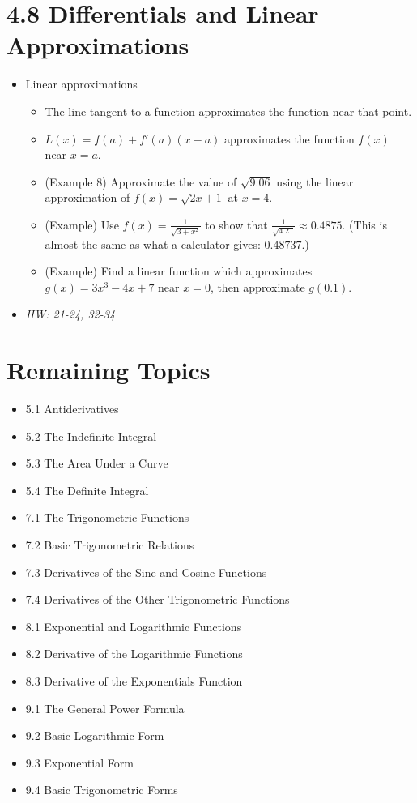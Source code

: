 \documentclass[11pt]{article}
\begin{document}
\section*{4.8 Differentials and Linear Approximations}

\begin{itemize}
\item Linear approximations
  \begin{itemize}
    \item The line tangent to a function approximates the function near that
          point.
    \item \(L(x)=f(a)+f'(a)(x-a)\) approximates the function \(f(x)\) near \(x=a\).
    \item (Example 8) Approximate the value of \(\sqrt{9.06}\) using the
          linear approximation of \(f(x)=\sqrt{2x+1}\) at \(x=4\).
    \item (Example) Use \(f(x)=\frac{1}{\sqrt{3+x^2}}\) to show
          that \(\frac{1}{\sqrt{4.21}}\approx 0.4875\).
          (This is almost the same as what a calculator gives: \(0.48737\).)
    \item (Example) Find a linear function which approximates
          \(g(x)=3x^3-4x+7\) near \(x=0\), then approximate \(g(0.1)\).
  \end{itemize}
\item\textit{
  HW: 21-24, 32-34
}
\end{itemize}



\section*{Remaining Topics}

\begin{itemize}
  \item 5.1 Antiderivatives
  \item 5.2 The Indefinite Integral
  \item 5.3 The Area Under a Curve
  \item 5.4 The Definite Integral
  \item 7.1 The Trigonometric Functions
  \item 7.2 Basic Trigonometric Relations
  \item 7.3 Derivatives of the Sine and Cosine Functions
  \item 7.4 Derivatives of the Other Trigonometric Functions
  \item 8.1 Exponential and Logarithmic Functions
  \item 8.2 Derivative of the Logarithmic Functions
  \item 8.3 Derivative of the Exponentials Function
  \item 9.1 The General Power Formula
  \item 9.2 Basic Logarithmic Form
  \item 9.3 Exponential Form
  \item 9.4 Basic Trigonometric Forms
\end{itemize}
\end{document}
